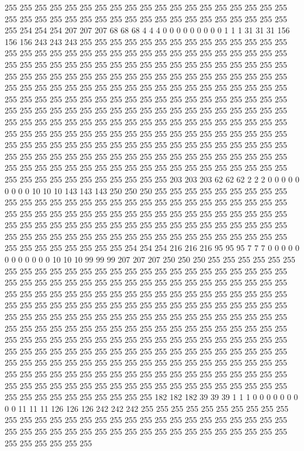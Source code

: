 255 255 255 255 255 255 255 255 255 255 255 255 255 255 255 255 255 255 255 255 255 255 255 255 255 255 255 255 255 255 255 255 255 255 255 255 255 255 255 254 254 254 207 207 207 68 68 68 4 4 4 0 0 0 0 0 0 0 0 0 1 1 1 31 31 31 156 156 156 243 243 243 255 255 255 255 255 255 255 255 255 255 255 255 255 255 255 255 255 255 255 255 255 255 255 255 255 255 255 255 255 255 255 255 255 255 255 255 255 255 255 255 255 255 255 255 255 255 255 255 255 255 255 255 255 255 255 255 
255 255 255 255 255 255 255 255 255 255 255 255 255 255 255 255 255 255 255 255 255 255 255 255 255 255 255 255 255 255 255 255 255 255 255 255 255 255 255 255 255 255 255 255 255 255 255 255 255 255 255 255 255 255 255 255 255 255 255 255 255 255 255 255 255 255 255 255 255 255 255 255 255 255 255 255 255 255 255 255 255 255 255 255 255 255 255 255 255 255 255 255 255 255 255 255 255 255 255 255 255 255 255 255 255 255 255 255 255 255 255 255 255 255 255 255 255 255 255 255 255 255 255 255 255 255 255 255 
255 255 255 255 255 255 255 255 255 255 255 255 255 255 255 255 255 255 255 255 255 255 255 255 255 255 255 255 255 255 255 255 255 255 255 255 255 255 255 255 255 255 255 255 255 255 255 255 255 255 203 203 203 62 62 62 2 2 2 0 0 0 0 0 0 0 0 0 10 10 10 143 143 143 250 250 250 255 255 255 255 255 255 255 255 255 255 255 255 255 255 255 255 255 255 255 255 255 255 255 255 255 255 255 255 255 255 255 255 255 255 255 255 255 255 255 255 255 255 255 255 255 255 255 255 255 255 255 
255 255 255 255 255 255 255 255 255 255 255 255 255 255 255 255 255 255 255 255 255 255 255 255 255 255 255 255 255 255 255 255 255 255 255 255 255 255 255 255 255 255 254 254 254 216 216 216 95 95 95 7 7 7 0 0 0 0 0 0 0 0 0 0 0 0 10 10 10 99 99 99 207 207 207 250 250 250 255 255 255 255 255 255 255 255 255 255 255 255 255 255 255 255 255 255 255 255 255 255 255 255 255 255 255 255 255 255 255 255 255 255 255 255 255 255 255 255 255 255 255 255 255 255 255 255 255 255 
255 255 255 255 255 255 255 255 255 255 255 255 255 255 255 255 255 255 255 255 255 255 255 255 255 255 255 255 255 255 255 255 255 255 255 255 255 255 255 255 255 255 255 255 255 255 255 255 255 255 255 255 255 255 255 255 255 255 255 255 255 255 255 255 255 255 255 255 255 255 255 255 255 255 255 255 255 255 255 255 255 255 255 255 255 255 255 255 255 255 255 255 255 255 255 255 255 255 255 255 255 255 255 255 255 255 255 255 255 255 255 255 255 255 255 255 255 255 255 255 255 255 255 255 255 255 255 255 
255 255 255 255 255 255 255 255 255 255 255 255 255 255 255 255 255 255 255 255 255 255 255 255 255 255 255 255 255 255 255 255 255 255 255 255 255 255 255 255 255 255 255 255 255 255 255 182 182 182 39 39 39 1 1 1 0 0 0 0 0 0 0 0 0 11 11 11 126 126 126 242 242 242 255 255 255 255 255 255 255 255 255 255 255 255 255 255 255 255 255 255 255 255 255 255 255 255 255 255 255 255 255 255 255 255 255 255 255 255 255 255 255 255 255 255 255 255 255 255 255 255 255 255 255 255 255 255 
